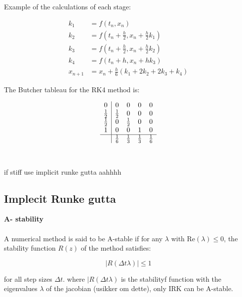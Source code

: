 Example of the calculations of each stage:

\begin{align}
k_1 &= f(t_n, x_n) \\
k_2 &= f\left(t_n + \frac{h}{2}, x_n + \frac{h}{2} k_1\right) \\
k_3 &= f\left(t_n + \frac{h}{2}, x_n + \frac{h}{2} k_2\right) \\
k_4 &= f(t_n + h, x_n + h k_3) \\
x_{n+1} &= x_n + \frac{h}{6} \left( k_1 + 2k_2 + 2k_3 + k_4 \right)
\end{align}

The Butcher tableau for the RK4 method is:

\[
\begin{array}{c|cccc}
0 & 0 & 0 & 0 & 0 \\
\frac{1}{2} & \frac{1}{2} & 0 & 0 & 0 \\
\frac{1}{2} & 0 & \frac{1}{2} & 0 & 0 \\
1 & 0 & 0 & 1 & 0 \\
\hline
 & \frac{1}{6} & \frac{1}{3} & \frac{1}{3} & \frac{1}{6} \\
\end{array}
\]
\\
\\
if stiff use implicit runke gutta aahhhh


\subsection{Implecit Runke gutta}
\textbf{A- stability}
\\
\\
A numerical method is said to be A-stable if for any \(\lambda\) with \(\text{Re}(\lambda) \leq 0\), the stability function \(R(z)\) of the method satisfies:

\[
|R(\Delta t \lambda)| \leq 1
\]

for all step sizes \(\Delta t\). where  $|R(\Delta t \lambda)$ is the stabilityf function with the eigenvalues $\lambda$  of the jacobian (usikker om dette), only IRK can be A-stable.